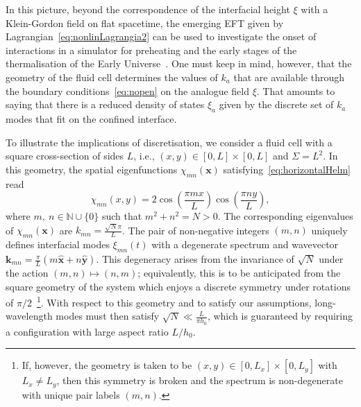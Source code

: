 \documentclass[a4paper]{jpconf}
\newcommand{\unvec}[1]{\bm{\hat{#1}}}
\begin{document}
In this picture, beyond the correspondence of the interfacial height $\xi$ with a Klein-Gordon field on flat spacetime, the emerging EFT given by Lagrangian~\eqref{eq:nonlinLagrangia2} can be used to investigate the onset of interactions in a simulator for preheating and the early stages of the thermalisation of the Early Universe~\cite{barroso2022primary}. One must keep in mind, however, that the geometry of the fluid cell determines the values of $k_a$ that are available through the boundary conditions~\eqref{eq:nopen} on the analogue field $\xi$. That amounts to saying that there is a reduced density of states $\xi_a$ given by the discrete set of $k_a$ modes that fit on the confined interface. 

To illustrate the implications of discretisation, we consider a fluid cell with a square cross-section of sides $L$, i.e., $(x,y)\in \left[0,L\right]\times\left[0,L\right]$ and $\Sigma=L^2$. In this geometry, the spatial eigenfunctions $\chi_{mn}(\bm{x})$ satisfying~\eqref{eq:horizontalHelm} read
\begin{equation}
\label{eq:eifunctions square}
    \chi_{mn}(x,y) = 2\cos\left(\frac{\pi m x}{L}\right)\cos\left(\frac{\pi n y}{L}\right),
\end{equation}
where $m,~n\in\mathbb{N}\cup\{0\}$ such that $m^2+n^2=N>0$. The corresponding eigenvalues of $\chi_{mn}(\bm{x})$ are $k_{mn}=\tfrac{\sqrt{N}\pi}{L}$. The pair of non-negative integers $(m,n)$ uniquely defines interfacial modes $\xi_{mn}(t)$ with a degenerate spectrum and wavevector $\bm{k}_{mn}=\tfrac{\pi}{L}(m\unvec{x}+n\unvec{y})$. This degeneracy arises from the invariance of $\sqrt{N}$ under the action $(m,n)\mapsto(n,m)$; equivalently, this is to be anticipated from the square geometry of the system which enjoys a discrete symmetry under rotations of $\pi/2$~\footnote{If, however, the geometry is taken to be $(x,y)\in[0,L_x]\times[0,L_y]$ with $L_x\neq L_y$, then this symmetry is broken and the spectrum is non-degenerate with unique pair labels $(m,n)$.}. With respect to this geometry and to satisfy our assumptions, long-wavelength modes must then satisfy $\sqrt{N}\ll \tfrac{L}{\pi h_0}$, which is guaranteed by requiring a configuration with large aspect ratio $L/h_0$.  
\end{document}
